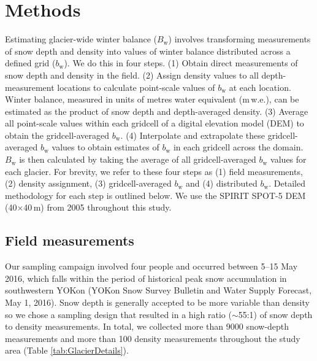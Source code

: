 \documentclass[twocolumn, letterpaper]{igs}
\begin{document}
\section{Methods}

Estimating glacier-wide winter balance ($B_\mathrm{w}$) involves transforming measurements of snow depth and density into values of winter balance distributed across a defined grid ($b_\mathrm{w}$). We do this in four steps. (1) Obtain direct measurements of snow depth and density in the field. (2) Assign density values to all depth-measurement locations to calculate point-scale values of $b_\mathrm{w}$ at each location. Winter balance, measured in units of metres water equivalent (m\,w.e.), can be estimated as the product of snow depth and depth-averaged density. (3) Average all point-scale values within each gridcell of a digital elevation model (DEM) to obtain the gridcell-averaged $b_\mathrm{w}$. (4) Interpolate and extrapolate these gridcell-averaged $b_\mathrm{w}$ values to obtain estimates of $b_\mathrm{w}$ in each gridcell across the domain. $B_\mathrm{w}$ is then calculated by taking the average of all gridcell-averaged $b_\mathrm{w}$ values for each glacier. For brevity, we refer to these four steps as (1) field measurements, (2) density assignment, (3) gridcell-averaged $b_\mathrm{w}$ and (4) distributed $b_\mathrm{w}$. Detailed methodology for each step is outlined below. We use the SPIRIT SPOT-5 DEM (40$\times$40\,m) from 2005 \citep{Korona2009} throughout this study. 

\subsection{Field measurements}

Our sampling campaign involved four people and occurred between 5--15 May 2016, which falls within the period of historical peak snow accumulation in southwestern YOKon (YOKon Snow Survey Bulletin and Water Supply Forecast, May 1, 2016). Snow depth is generally accepted to be more variable than density \citep{Elder1991, Clark2011, Lopez2013} so we chose a sampling design that resulted in a high ratio ($\sim$55:1) of snow depth to density measurements. In total, we collected more than 9000 snow-depth measurements and more than 100 density measurements throughout the study area (Table \ref {tab:GlacierDetails}).
\end{document}
